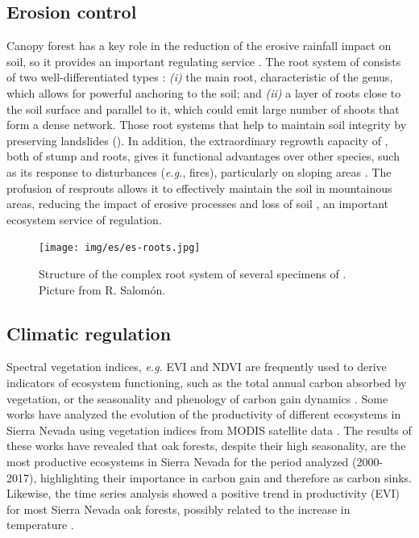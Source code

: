 \subsection{Erosion control}\label{sec:es:regulation-erosion}
Canopy forest has a key role in the reduction of the erosive rainfall impact on soil, so it provides an important regulating service \autocites{Zhongmingetal2010StratifiedVegetation,GarciaRuizetal2011MediterraneanWater}. The root system of \Qp consists of two well-differentiated types \autocites{Allue1995OrdenacionMasas}: \emph{(i)} the main root, characteristic of the genus, which allows for powerful anchoring to the soil; and \emph{(ii)} a layer of roots close to the soil surface and parallel to it, which could emit large number of shoots that form a dense network. Those root systems that help to maintain soil integrity by preserving landslides \autocites{MesonMontoya1985VegetacionForestal,Salomonetal2017GeneralFailure} (). In addition, the extraordinary regrowth capacity of \Qp, both of stump and roots, gives it functional advantages over other species, such as its response to disturbances (\emph{e.g.}, fires), particularly on sloping areas \autocites{RuizdelaTorre2006FloraMayor,ValbuenaCarabanaGil2017CentenaryCoppicing}. The profusion of resprouts allows it to effectively maintain the soil in mountainous areas, reducing the impact of erosive processes and loss of soil \autocites{MesonGarcia1984BasesEcologicas}, an important ecosystem service of regulation. 

\begin{figure}
    \centering
    \texttt{[image: img/es/es-roots.jpg]}\caption{Structure of the complex root system of several specimens of \Qp. Picture from R. Salomón.}\label{fig:es:roots}
\end{figure}

\subsection{Climatic regulation}\label{sec:es:regulation-climatic}
Spectral vegetation indices, \emph{e.g.} EVI and NDVI are frequently used to derive indicators of ecosystem functioning, such as the total annual carbon absorbed by vegetation, or the seasonality and phenology of carbon gain dynamics \autocites{Xiaoetal2019RemoteSensing,
AlcarazSeguraetal2009BaselineCharacterization,AlcarazSeguraetal2009UseDescriptors,Cazorlaetal2020RemoteSensingbased}. Some works have analyzed the evolution of the productivity of different ecosystems in Sierra Nevada using vegetation indices from MODIS satellite data \autocites{Dionisioetal2012SatelliteBasedMonitoring,Alcaraz2016obsnev_ndvi,PerezLuque2015onto,Cazorlaetal2020RemoteSensingbased}. The results of these works have revealed that oak forests, despite their high seasonality, are the most productive ecosystems in Sierra Nevada for the period analyzed (2000-2017), highlighting their importance in carbon gain and therefore as carbon sinks. Likewise, the time series analysis showed a positive trend in productivity (EVI) for most Sierra Nevada oak forests, possibly related to the increase in temperature \autocite{PerezLuque2015onto}. 

